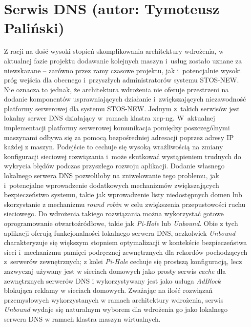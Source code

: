 \section{Serwis DNS (autor: Tymoteusz Paliński)}
Z racji na dość wysoki stopień skomplikowania architektury wdrożenia, w aktualnej fazie projektu dodawanie kolejnych maszyn i~usług zostało uznane za niewskazane -- zarówno przez ramy czasowe projektu, jak i~potencjalnie wysoki próg wejścia dla obecnego i~przyszłych administratorów systemu STOS-NEW. Nie oznacza to jednak, że architektura wdrożenia nie oferuje przestrzeni na dodanie komponentów usprawniających działanie i~zwiększających niezawodność platformy serwerowej dla systemu STOS-NEW.
\newline \noindent Jednym z~takich serwisów jest lokalny serwer DNS działający w~ramach klastra xcp-ng. W~aktualnej
implementacji platformy serwerowej komunikacja pomiędzy poszczególnymi maszynami odbywa się za pomocą bezpośredniej adresacji poprzez adresy IP każdej z maszyn. Podejście to cechuje się wysoką wrażliwością na zmiany konfiguracji sieciowej rozwiązania i~może skutkować wystąpieniem trudnych do wykrycia błędów podczas przyszłego rozwoju aplikacji. Dodanie własnego lokalnego serwera DNS pozwoliłoby na zniwelowanie tego problemu, jak i~potencjalne wprowadzenie dodatkowych mechanizmów zwiększających bezpieczeństwo systemu, takie jak wprowadzenie listy niedostępnych domen lub skorzystanie z mechanizmu \textit{round robin} w celu zwiększenia przepustowości ruchu sieciowego\cite{roundRobin}.
\newline \noindent Do wdrożenia takiego rozwiązania można wykorzystać gotowe oprogramowanie otwartoźródłowe, takie jak \textit{Pi-Hole} lub \textit{Unbound}\cite{pihole, unboundDns}. Obie z tych aplikacji oferują funkcjonalności lokalnego serwera DNS, aczkolwiek \textit{Unbound} charakteryzuje się większym stopniem optymalizacji w kontekście bezpieczeństwa sieci i~mechanizmu pamięci podręcznej zewnętrznych dla rekordów pochodzących z~serwerów zewnętrznych; z kolei \textit{Pi-Hole} cechuje się prostszą konfiguracją, lecz zazwyczaj używany jest w sieciach domowych jako prosty serwis \textit{cache} dla zewnętrznych serwerów DNS i wykorzystywany jest jako usługa \textit{AdBlock} blokująca reklamy w sieciach domowych. Zważając na ilość rozwiązań przemysłowych wykorzystanych w ramach architektury wdrożenia, serwis \textit{Unbound} wydaje się naturalnym wyborem dla wdrożenia go jako lokalnego serwera DNS w ramach klastra maszyn wirtualnych.


